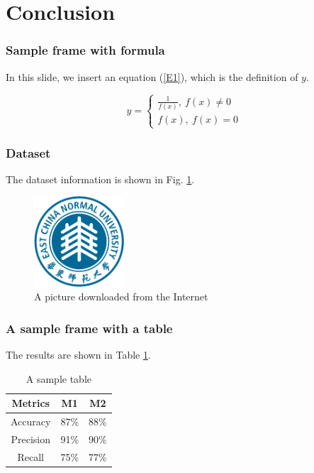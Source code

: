 \documentclass[14pt]{beamer}
\begin{document}
\section{Conclusion}

\begin{frame}
\frametitle{Sample frame with formula}

In this slide, we insert an equation (\ref{E1}), which is the definition of $y$.

\begin{equation}
\label{E1}
y=
\begin{cases}
\frac{1}{f(x)},\ f(x) \neq 0 \\
f(x), \ f(x)=0
\end{cases}
\end{equation}

\end{frame}



\begin{frame}
\frametitle{Dataset}

The dataset information is shown in Fig. \ref{dataset}.

\begin{figure}[ht]
\centering
\includegraphics[width=0.3\textwidth]{ecnu_logo.png}
\caption{A picture downloaded from the Internet} 
\label{dataset}
\end{figure}

\end{frame}


\begin{frame}
\frametitle{A sample frame with a table}

The results are shown in Table \ref{T1}.

\begin{table}[ht]
\caption{A sample table}
\label{T1}
\centering
\footnotesize
\begin{tabular}{c|c|c}
\toprule %
Metrics   &   M1 &	M2	\\
\hline
Accuracy  &  87\% &	88\%	\\
Precision &  91\% &	90\%	\\
Recall	  & 75\% &	77\%	\\
\bottomrule %
\end{tabular}
\end{table}

\end{frame}
\end{document}
